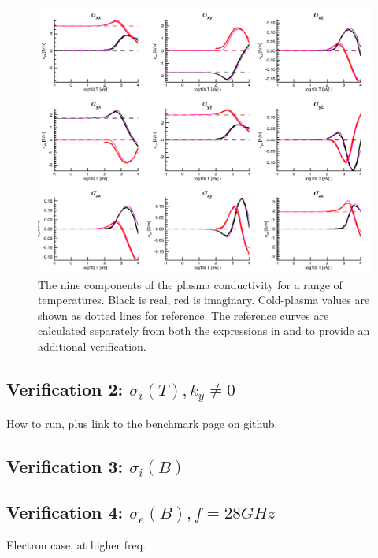 \documentclass[final,5p,times,twocolumn]{elsarticle}
\begin{document}
\begin{figure}
\centering
\includegraphics[]{figures/kj_sigma_vs_t}
\caption{The nine components of the plasma conductivity for a range of temperatures. Black is real, red is imaginary. Cold-plasma values are shown as dotted lines for reference. The reference curves are calculated separately from both the expressions in \cite{brambilla} and \cite{swanson} to provide an additional verification.}
\label{fig:sig_vs_t}
\end{figure}

\subsection{Verification 2: $\sigma_i\left(T\right), k_{y}\ne 0$}
\label{section:verification2}

How to run, plus link to the benchmark page on github.

\subsection{Verification 3: $\sigma_i\left(B\right)$}
\label{section:verification3}

\subsection{Verification 4: $\sigma_e\left(B\right), f=28 GHz$}
\label{section:verification4}

Electron case, at higher freq.
\end{document}

